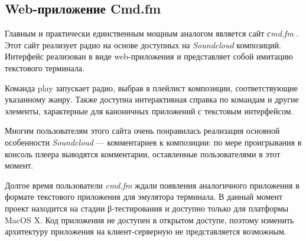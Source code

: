 \subsection{Web-приложение Cmd.fm}

Главным и практически единственным мощным аналогом является сайт
\textit{сmd.fm} \cite{cmd-fm:main}. Этот сайт реализует радио на основе доступных на
\textit{Soundcloud} композиций. Интерфейс реализован в виде
web-приложения и представляет собой имитацию текстового терминала.


Команда play запускает радио, выбрав в плейлист
композиции, соответствующие указанному жанру. Также доступна
интерактивная  справка по командам и другие элементы, характерные для
каноничных приложений с текстовым интерфейсом. 

Многим пользователям этого сайта очень понравилась \cite{stubler:cmdfm}
реализация основной особенности \textit{Soundcloud} --- комментариев к
композиции: по мере проигрывания в консоль плеера выводятся
комментарии, оставленные пользователями в этот момент. 

Долгое время пользователи \textit{cmd.fm} ждали появления аналогичного
приложения в формате текстового приложения для эмулятора
терминала. В данный момент проект находится на стадии
β-тестирования и доступно только для платформы MacOS X. Код
приложения не доступен в открытом доступе, поэтому изменить
архитектуру приложения на клиент-серверную не представляется возможным.